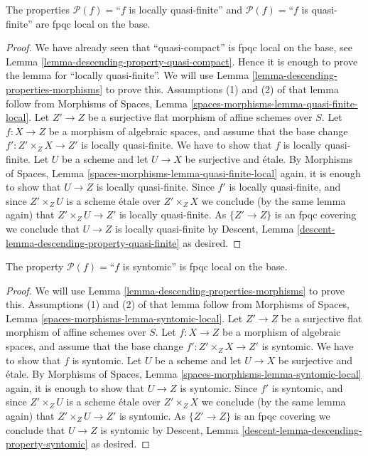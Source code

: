 \begin{lemma}
\label{lemma-descending-property-quasi-finite}
The properties
$\mathcal{P}(f) =$``$f$ is locally quasi-finite''
and
$\mathcal{P}(f) =$``$f$ is quasi-finite''
are fpqc local on the base.
\end{lemma}

\begin{proof}
We have already seen that ``quasi-compact'' is fpqc local on the base, see
Lemma \ref{lemma-descending-property-quasi-compact}. Hence it is enough
to prove the lemma for ``locally quasi-finite''. We will use
Lemma \ref{lemma-descending-properties-morphisms}
to prove this. Assumptions (1) and (2) of that lemma follow from
Morphisms of Spaces,
Lemma \ref{spaces-morphisms-lemma-quasi-finite-local}.
Let $Z' \to Z$ be a surjective flat morphism of affine schemes over $S$.
Let $f : X \to Z$ be a morphism of algebraic spaces, and assume
that the base change $f' : Z' \times_Z X \to Z'$ is locally quasi-finite.
We have to show that $f$ is locally quasi-finite. Let $U$ be a scheme
and let $U \to X$ be surjective and \'etale. By
Morphisms of Spaces,
Lemma \ref{spaces-morphisms-lemma-quasi-finite-local}
again, it is enough to show that $U \to Z$ is locally quasi-finite.
Since $f'$ is locally quasi-finite, and since $Z' \times_Z U$ is a
scheme \'etale over $Z' \times_Z X$ we conclude (by the same lemma again) that
$Z' \times_Z U \to Z'$ is locally quasi-finite.
As $\{Z' \to Z\}$ is an fpqc covering we conclude that
$U \to Z$ is locally quasi-finite by
Descent, Lemma \ref{descent-lemma-descending-property-quasi-finite}
as desired.
\end{proof}

\begin{lemma}
\label{lemma-descending-property-syntomic}
The property $\mathcal{P}(f) =$``$f$ is syntomic''
is fpqc local on the base.
\end{lemma}

\begin{proof}
We will use
Lemma \ref{lemma-descending-properties-morphisms}
to prove this. Assumptions (1) and (2) of that lemma follow from
Morphisms of Spaces,
Lemma \ref{spaces-morphisms-lemma-syntomic-local}.
Let $Z' \to Z$ be a surjective flat morphism of affine schemes over $S$.
Let $f : X \to Z$ be a morphism of algebraic spaces, and assume
that the base change $f' : Z' \times_Z X \to Z'$ is syntomic.
We have to show that $f$ is syntomic. Let $U$ be a scheme
and let $U \to X$ be surjective and \'etale. By
Morphisms of Spaces,
Lemma \ref{spaces-morphisms-lemma-syntomic-local}
again, it is enough to show that $U \to Z$ is syntomic.
Since $f'$ is syntomic, and since $Z' \times_Z U$ is a
scheme \'etale over $Z' \times_Z X$ we conclude (by the same lemma again) that
$Z' \times_Z U \to Z'$ is syntomic.
As $\{Z' \to Z\}$ is an fpqc covering we conclude that
$U \to Z$ is syntomic by
Descent, Lemma \ref{descent-lemma-descending-property-syntomic}
as desired.
\end{proof}

